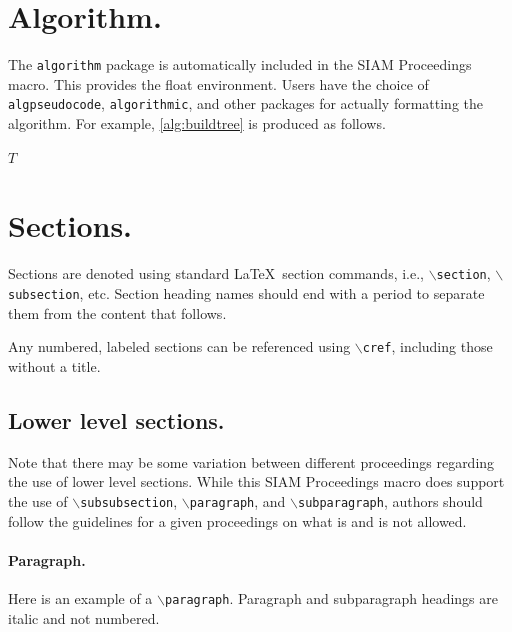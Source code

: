 \documentclass[twoside,leqno,twocolumn]{article}
\begin{document}
\section{Algorithm.}
\label{sec:alg}

The \texttt{algorithm} package is automatically included in the SIAM Proceedings
macro. This provides the float environment. Users have the choice of \texttt{algpseudocode},
\texttt{algorithmic}, and other packages for actually formatting the algorithm.
For example, \cref{alg:buildtree} is produced as follows.

\begin{algorithm}
\caption{Build tree}
\label{alg:buildtree}
\begin{algorithmic}
\ENDWHILE
\RETURN $T$
\end{algorithmic}
\end{algorithm}

\section{Sections.}
\label{sec:sec}
Sections are denoted using standard \LaTeX\ section commands, i.e.,
$\backslash$\texttt{section}, $\backslash$\texttt{subsection}, etc. Section heading names should end with a period to separate them from the content that follows.

Any numbered, labeled sections can be referenced using $\backslash$\texttt{cref},
including those without a title.

\subsection{Lower level sections.}
Note that there may be some variation between different proceedings regarding the use of lower level sections. 
While this SIAM Proceedings macro does support the use of $\backslash$\texttt{subsubsection}, $\backslash$\texttt{paragraph}, 
and $\backslash$\texttt{subparagraph}, authors should follow the guidelines for a given proceedings on what is and is not
allowed.

\paragraph{Paragraph.}
Here is an example of a $\backslash$\texttt{paragraph}. Paragraph and subparagraph headings are italic and not numbered.
\end{document}
